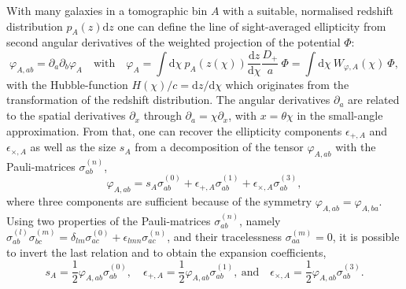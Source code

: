 \documentclass[a4paper,fleqn,usenatbib]{mnras}
\newcommand{\dd}{\mathrm{d}}
\begin{document}
With many galaxies in a tomographic bin $A$ with a suitable, normalised redshift distribution $p_A(z)\dd z$ one can define the line of sight-averaged ellipticity from second angular derivatives of the weighted projection of the potential $\Phi$:
\begin{equation}
\varphi_{A,ab} = \partial_a\partial_b\varphi_A
\quad\mathrm{with}\quad
\varphi_A = \int\dd\chi\:p_A(z(\chi))\frac{\dd z}{\dd\chi}\frac{D_+}{a}\:\Phi = \int\dd\chi\:W_{\varphi,A}(\chi)\:\Phi,
\end{equation}
with the Hubble-function $H(\chi)/c = \dd z/\dd\chi$ which originates from the transformation of the redshift distribution. The angular derivatives $\partial_a$ are related to the spatial derivatives $\partial_x$ through $\partial_a = \chi\partial_x$, with $x=\theta\chi$ in the small-angle approximation. From that, one can recover the ellipticity components $\epsilon_{+,A}$ and $\epsilon_{\times,A}$ as well as the size $s_A$ from a decomposition of the tensor $\varphi_{A,ab}$ with the Pauli-matrices $\sigma_{ab}^{(n)}$,
\begin{equation}
\varphi_{A,ab} = s_A\sigma^{(0)}_{ab} + \epsilon_{+,A}\sigma^{(1)}_{ab} + \epsilon_{\times,A}\sigma^{(3)}_{ab},
\end{equation}
where three components are sufficient because of the symmetry $\varphi_{A,ab} = \varphi_{A,ba}$. Using two properties of the Pauli-matrices $\sigma_{ab}^{(n)}$, namely $\sigma_{ab}^{(l)}\sigma_{bc}^{(m)} = \delta_{lm}\sigma^{(0)}_{ac} + \epsilon_{lmn}\sigma^{(n)}_{ac}$, and their tracelessness $\sigma^{(m)}_{aa} = 0$, it is possible to invert the last relation and to obtain the expansion coefficients,
\begin{equation}
s_A = \frac{1}{2}\varphi_{A,ab}\sigma^{(0)}_{ab},
\quad
\epsilon_{+,A} = \frac{1}{2}\varphi_{A,ab}\sigma^{(1)}_{ab},
\mathrm{~and}\quad
\epsilon_{\times,A} = \frac{1}{2}\varphi_{A,ab}\sigma^{(3)}_{ab}.
\end{equation}
\end{document}
